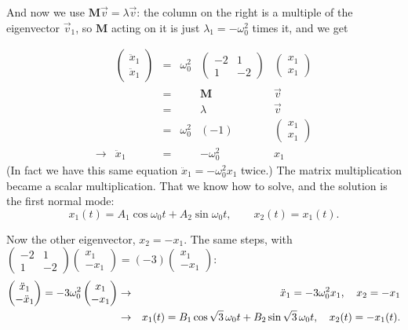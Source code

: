 \documentclass[12pt]{article}
\numberwithin{equation}{section}
\newcommand{\wo}{\omega_0}
\begin{document}
\noindent And now we use $\mathbf{M}\vec{v} = \lambda\vec{v}$: the column
on the right is a multiple of the eigenvector $\vec{v}_1$, so $\mathbf{M}$
acting on it is just $\lambda_1 = -\wo^2$ times it, and we get

\begin{equation}
  \begin{array}{cccccc}
    & \begin{pmatrix} \ddot{x}_1 \\ \ddot{x}_1 \end{pmatrix}
    & = & \wo^2 & \begin{pmatrix} -2 & 1 \\ 1 & -2 \end{pmatrix}
    & \begin{pmatrix} x_1 \\ x_1 \end{pmatrix} \\[1.5ex]
    & & = & & \mathbf{M} & \vec{v} \\[1.5ex]
    & & = & & \lambda & \vec{v} \\[1.5ex]
    & & = & \wo^2 & (-1) & \begin{pmatrix} x_1 \\ x_1 \end{pmatrix} \\[1.5ex]
    \rightarrow & \ddot{x}_1 & = & & -\wo^2 & x_1
  \end{array}
\end{equation}
(In fact we have this same equation $\ddot{x}_1 = -\wo^2 x_1$ twice.) The matrix multiplication
became a scalar multiplication. That we know how to solve, and the
solution is the first normal mode:
\begin{equation}
  x_1(t) = A_1\cos\wo t + A_2\sin\wo t, \qquad x_2(t) = x_1(t).
\end{equation}

Now the other eigenvector, $x_2 = -x_1$. The same steps, with
$\left(\begin{smallmatrix} -2 & 1 \\ 1 & -2 \end{smallmatrix}\right)
\left(\begin{smallmatrix} x_1 \\ -x_1 \end{smallmatrix}\right) =
(-3)\left(\begin{smallmatrix} x_1 \\ -x_1 \end{smallmatrix}\right)$:
\begin{eqnarray}
  \begin{pmatrix} \ddot{x}_1 \\ -\ddot{x}_1 \end{pmatrix}
  = -3\wo^2 \begin{pmatrix} x_1 \\ -x_1 \end{pmatrix}
  &\rightarrow& \ddot{x}_1 = -3\wo^2 x_1, \quad x_2 = -x_1 \notag \\
  &\rightarrow&
  x_1(t) = B_1\cos\sqrt{3}\,\wo t + B_2\sin\sqrt{3}\,\wo t, \quad x_2(t) = -x_1(t).
\end{eqnarray}
\end{document}
